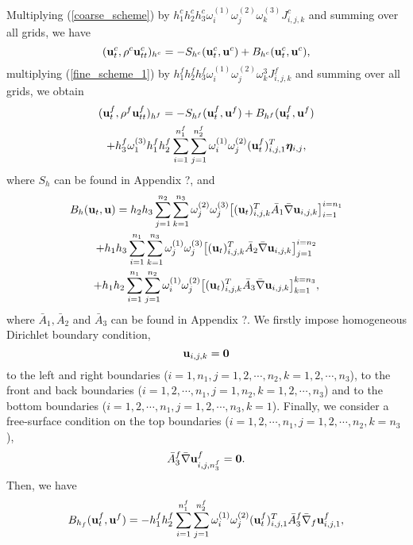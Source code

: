 \documentclass[a4paper]{article}
\begin{document}
Multiplying (\ref{coarse_scheme}) by $h_1^ch_2^ch_3^c\omega_i^{(1)}\omega_j^{(2)}\omega_k^{(3)}J_{i,j,k}^c$ and summing over all grids, we have
\begin{equation}\label{coarse_simple}
({\bf u}_t^c, \rho^c{\bf u}_{tt}^c)_{h^c} = -S_{h^c}({\bf u}_t^c,{\bf u}^c) + B_{h^c}({\bf u}_t^c,{\bf u}^c),
\end{equation}
multiplying (\ref{fine_scheme_1}) by $h_1^fh_2^fh_3^f\omega_i^{(1)}\omega_j^{(2)}\omega_k^{3}J_{i,j,k}^f$ and summing over all grids, we obtain
\begin{multline}\label{fine_simple}
({\bf u}_t^f, \rho^f{\bf u}_{tt}^f)_{h^f} = -S_{h^f}({\bf u}_t^f,{\bf u}^f) + B_{h^f}({\bf u}_t^f,{\bf u}^f) \\
+h_3^f\omega_1^{(3)}h_1^fh_2^f\sum_{i=1}^{n_1^f}\sum_{j=1}^{n_2^f}\omega_i^{(1)}\omega_j^{(2)}({\bf u}_t^f)_{i,j,1}^{T}{\bm \eta}_{i,j},
\end{multline}
where  $S_h$ can be found in Appendix ?, and 
\begin{multline*}
B_h({\bf u}_t, {\bf u}) = h_2h_3\sum_{j=1}^{n_2}\sum_{k=1}^{n_3}\omega_j^{(2)}\omega_j^{(3)}\big[({\bf u}_t)_{i,j,k}^{T}\bar{A}_1\bar{\nabla}{\bf u}_{i,j,k}\big]_{i=1}^{i=n_1}\\
+h_1h_3\sum_{i=1}^{n_1}\sum_{k=1}^{n_3}\omega_j^{(1)}\omega_j^{(3)}\big[({\bf u}_t)_{i,j,k}^{T}\bar{A}_2\bar{\nabla}{\bf u}_{i,j,k}\big]_{j=1}^{i=n_2}\\
+h_1h_2\sum_{i=1}^{n_1}\sum_{j=1}^{n_2}\omega_i^{(1)}\omega_j^{(2)}\big[({\bf u}_t)_{i,j,k}^{T}\bar{A}_3\bar{\nabla}{\bf u}_{i,j,k}\big]_{k=1}^{k=n_3},
\end{multline*}
where $\bar{A}_1, \bar{A}_2$ and $\bar{A}_3$ can be found in Appendix ?.  We firstly impose homogeneous Dirichlet boundary condition,
\begin{equation*}
{\bf u}_{i,j,k} = {\bf 0}
\end{equation*}
to the left and right boundaries ($i = 1,n_1, j = 1,2,\cdots,n_2,k = 1,2,\cdots,n_3$), to the front and back boundaries ($i = 1,2,\cdots,n_1, j = 1,n_2,k = 1,2,\cdots,n_3$) and to the bottom boundaries ($i = 1,2,\cdots,n_1, j = 1,2,\cdots,n_3, k = 1$). Finally, we consider a free-surface condition on the top boundaries ($i = 1,2,\cdots,n_1, j = 1,2,\cdots,n_2, k = n_3$),
\begin{equation*}
\bar{A}_3^f\bar{\nabla} {\bf u}_{i,j,n_3^f}^f = {\bf 0}.
\end{equation*}
Then, we have
\begin{equation}\label{boundary_f}
B_{h_f} ({\bf u}_t^f,{\bf u}^f) = -h_1^fh_2^f\sum_{i = 1}^{n_1^f}\sum_{j=1}^{n_2^f}\omega_i^{(1)}\omega_j^{(2)}({\bf u}_t^f)^T_{i,j,1}\bar{A}_3^f\bar{\nabla}_f{\bf u}^f_{i,j,1},
\end{equation}
\end{document}
